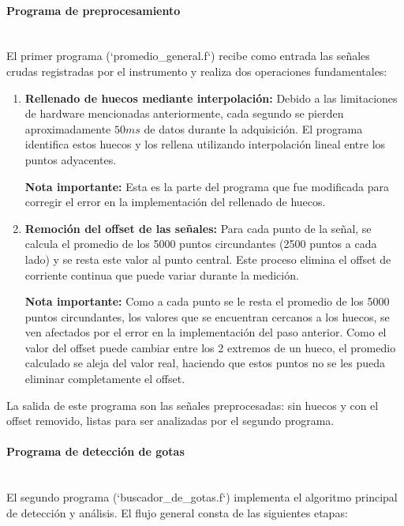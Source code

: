 \documentclass[12pt,a4paper]{article}
\newcommand{\subsubsubsection}[1]{\paragraph{#1}\mbox{}\\}
\begin{document}
\subsubsubsection{Programa de preprocesamiento}

El primer programa (`promedio\_general.f`) recibe como entrada las señales crudas registradas por el instrumento y realiza dos operaciones fundamentales:    

\begin{enumerate}
    \item \textbf{Rellenado de huecos mediante interpolación:} Debido a las limitaciones de
hardware mencionadas anteriormente, cada segundo se pierden aproximadamente
$50ms$ de datos durante la adquisición. El programa identifica estos huecos y los
rellena utilizando interpolación lineal entre los puntos adyacentes.

\textbf{Nota importante:} Esta es la parte del programa que fue modificada para corregir el error en la implementación del rellenado de huecos.

\item \textbf{Remoción del offset de las señales:} Para cada punto de la señal, se calcula el
promedio de los 5000 puntos circundantes (2500 puntos a cada lado) y se resta este
valor al punto central. Este proceso elimina el offset de corriente continua que puede
variar durante la medición.

\textbf{Nota importante:} Como a cada punto se le resta el promedio de los 5000 puntos circundantes, los valores que se encuentran cercanos a los huecos, se ven afectados por el error en la implementación del paso anterior. Como el valor del offset puede cambiar entre los 2 extremos de un hueco, el promedio calculado se aleja del valor real, haciendo que estos puntos no se les pueda eliminar completamente el offset.

\end{enumerate}

La salida de este programa son las señales preprocesadas: sin huecos y con el offset
removido, listas para ser analizadas por el segundo programa.

\subsubsubsection{Programa de detección de gotas}

El segundo programa (`buscador\_de\_gotas.f`) implementa el algoritmo principal de
detección y análisis. El flujo general consta de las siguientes etapas:
\end{document}
